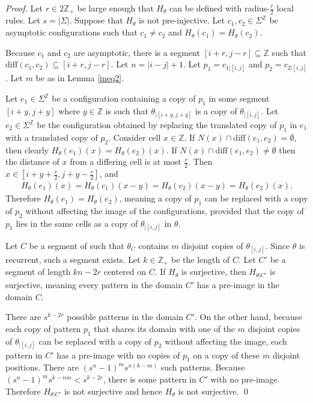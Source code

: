 \documentclass[runningheads]{llncs}
\newcommand{\Z}{\mathbb{Z}}
\begin{document}
\begin{proof}
Let $r \in 2\Z_+$ be large enough that $H_\theta$ can be defined with radius-$\frac{r}{2}$ local rules. Let $s = |\Sigma|$. Suppose that $H_\theta$ is not pre-injective. Let $c_1,c_2 \in \Sigma^\Z$ be asymptotic configurations such that $c_1 \neq c_2$ and $H_\theta (c_1) = H_\theta (c_2)$.

Because $c_1$ and $c_2$ are asymptotic, there is a segment $[i+r,j-r] \subseteq \Z$ such that $\mathrm{diff}(c_1,c_2) \subseteq [i+r, j-r]$. Let $n = |i-j| +1$. Let $p_1 = c_{1|[i,j]}$ and $p_2 = c_{2|[i,j]}$. Let $m$ be as in Lemma \ref{ineq2}.

Let $e_1 \in \Sigma^\Z$ be a configuration containing a copy of $p_1$ in some segment $[i+y,j+y]$ where $y\in\Z$ is such that $\theta_{|[i+y,j+y]}$ is a copy of $\theta_{|[i,j]}$. Let $e_2 \in \Sigma^\Z$ be the configuration obtained by replacing the translated copy of $p_1$ in $e_1$ with a translated copy of $p_2$. Consider cell $x \in \Z$. If $N(x) \cap \mathrm{diff}(e_1,e_2) = \emptyset$, then clearly $H_\theta (e_1)(x) = H_\theta (e_2)(x)$.  If $N(x) \cap \mathrm{diff}(e_1,e_2) \neq \emptyset$ then the distance of $x$ from a differing cell is at most $\frac{r}{2}$. Then $x \in [i+y+\frac{r}{2},j+y-\frac{r}{2}]$, and
\begin{align*}
H_\theta (e_1)(x) = H_\theta (c_1)(x-y)= H_\theta(c_2)(x-y) = H_\theta (e_2)(x).
\end{align*}
Therefore $H_\theta (e_1) = H_\theta (e_2)$, meaning a copy of $p_1$ can be replaced with a copy of $p_2$ without affecting the image of the configurations, provided that the copy of $p_1$ lies in the same cells as a copy of $\theta_{|[i,j]}$ in $\theta$.

Let $C$ be a segment of such that $\theta_C$ contains $m$ disjoint copies of $\theta_{[i,j]}$. Since $\theta$ is recurrent, such a segment exists. Let $k\in \Z_+$ be the length of $C$. Let $C'$ be a segment of length $kn-2r$ centered on $C$. If $H_\theta$ is surjective, then $H_{\theta|C'}$ is surjective, meaning every pattern in the domain $C'$ has a pre-image in the domain $C$. 

There are $s^{k-2r}$ possible patterns in the domain $C'$. On the other hand, because each copy of pattern $p_1$ that shares its domain with one of the $m$ disjoint copies of $\theta_{|[i,j]}$ can be replaced with a copy of $p_2$ without affecting the image, each pattern in $C'$ has a pre-image with no copies of $p_1$ on a copy of these $m$ disjoint positions. There are $(s^n-1)^m s^{n(k-m)}$ such patterns. Because $(s^n-1)^m s^{k-nm} < s^{k-2r}$,  there is some pattern in $C'$ with no pre-image. Therefore $H_{\theta|C'}$ is not surjective and hence $H_\theta$ is not surjective.
\qed
\end{proof}
\end{document}
